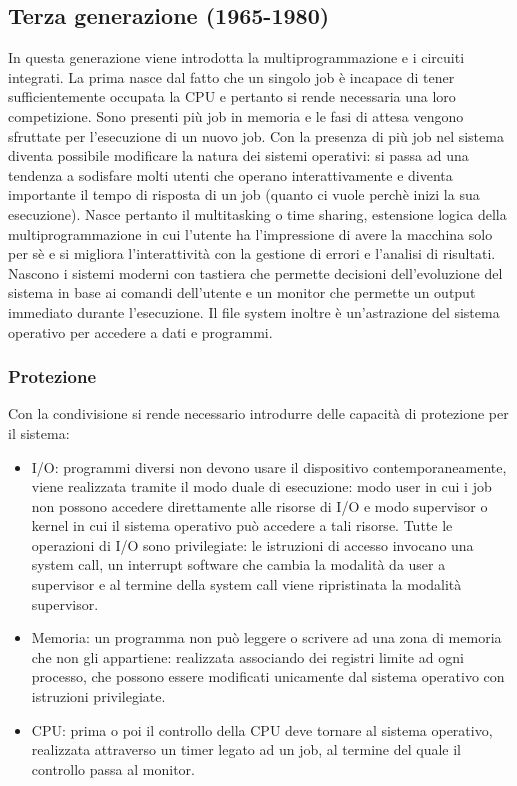 \subsection{Terza generazione (1965-1980)}
In questa generazione viene introdotta la multiprogrammazione e i circuiti integrati. La prima nasce dal fatto che un singolo job \`e incapace di tener sufficientemente occupata la CPU e pertanto si rende 
necessaria una loro competizione. Sono presenti pi\`u job in memoria e le fasi di attesa vengono sfruttate per l'esecuzione di un nuovo job. 
Con la presenza di pi\`u job nel sistema diventa possibile modificare la natura dei sistemi operativi: si passa ad una tendenza a sodisfare molti utenti che
operano interattivamente e diventa importante il tempo di risposta di un job (quanto ci vuole perch\`e inizi la sua esecuzione). Nasce pertanto il 
multitasking o time sharing, estensione logica della multiprogrammazione in cui l'utente ha l'impressione di avere la macchina solo per s\`e e si migliora
l'interattivit\`a con la gestione di errori e l'analisi di risultati. Nascono i sistemi moderni con tastiera che permette decisioni dell'evoluzione del 
sistema in base ai comandi dell'utente e un monitor che permette un output immediato durante l'esecuzione. Il file system inoltre \`e un'astrazione del
sistema operativo per accedere a dati e programmi.
\subsubsection{Protezione}
Con la condivisione si rende necessario introdurre delle capacit\`a di protezione per il sistema:
\begin{itemize}
\item I/O: programmi diversi non devono usare il dispositivo contemporaneamente, viene realizzata tramite il modo duale di esecuzione: modo user in cui i 
job non possono accedere direttamente alle risorse di I/O e modo supervisor o kernel in cui il sistema operativo pu\`o accedere a tali risorse. Tutte le
operazioni di I/O sono privilegiate: le istruzioni di accesso invocano una system call, un interrupt software che cambia la modalit\`a da user a supervisor
e al termine della system call viene ripristinata la modalit\`a supervisor.
\item Memoria: un programma non pu\`o leggere o scrivere ad una zona di memoria che non gli appartiene: realizzata associando dei registri limite ad ogni
processo, che possono essere modificati unicamente dal sistema operativo con istruzioni privilegiate.
\item CPU: prima o poi il controllo della CPU deve tornare al sistema operativo, realizzata attraverso un timer legato ad un job, al termine del quale il 
controllo passa al monitor. 
\end{itemize}
